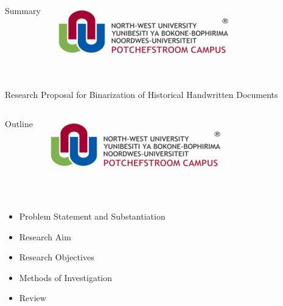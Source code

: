 \documentclass[11pt]{beamer}
\begin{document}
	\begin{frame}[t]
		\begin{columns}[onlytextwidth]
				\begin{Large}
					\vspace{-0.2cm}
					\color{beamer@maroon}Summary
				\end{Large}
			\column{0.25\textwidth}
				\includegraphics[scale=0.4]{nwulogo.jpeg}
		\end{columns}
		\hspace{6.5cm}
		\newline
		\noindent\makebox[\linewidth]{\rule{\paperwidth}{0.4pt}}\\
		[2cm]
		Research Proposal for Binarization of Historical Handwritten Documents
	\end{frame}


	\begin{frame}[t]
		\begin{columns}[onlytextwidth]
			\column{0.75\textwidth}
				\begin{Large}
					\vspace{-0.2cm}
					\color{beamer@maroon}Outline
				\end{Large}
				\includegraphics[scale=0.4]{nwulogo.jpeg}
		\end{columns}
		\hspace{6.5cm}
		\newline
		\noindent\makebox[\linewidth]{\rule{\paperwidth}{0.4pt}}\\
		[1cm]
		\begin{itemize}
			\item Problem Statement and Substantiation %
			\item Research Aim %
			\item Research Objectives %
			\item Methods of Investigation %
			\item Review
		\end{itemize}
	\end{frame}
\end{document}
